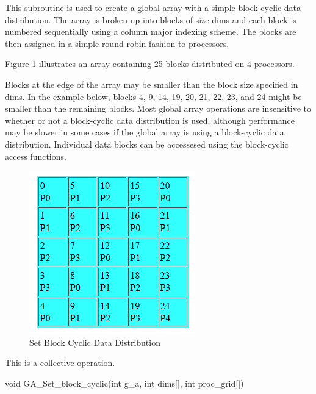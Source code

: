 \documentclass[12pt]{article}
\begin{document}
\begin{desc}

  This subroutine is used to create a global array with a simple
  block-cyclic data distribution. The array is broken up into blocks
  of size dims and each block is numbered sequentially using a column
  major indexing scheme. The blocks are then assigned in a simple
  round-robin fashion to processors.

Figure \ref{stblkcy} illustrates an array containing 25 blocks distributed on 4 processors.

  Blocks at the edge of the array may be smaller than the block size
  specified in dims. In the example below, blocks
  4, 9, 14, 19, 20, 21, 22, 23, and 24 might be smaller than the remaining
  blocks. Most global array operations are insensitive to whether or
  not a block-cyclic data distribution is used, although performance
  may be slower in some cases if the global array is using a
  block-cyclic data distribution. Individual data blocks can be
  accessesed using the block-cyclic access functions.

\begin{figure}
\centering
\includegraphics{StBlkCy}
\caption{Set Block Cyclic Data Distribution}
\label{stblkcy}
\end{figure}

  This is a collective operation.

\end{desc}


\begin{capi}
\begin{ccode}
void GA_Set_block_cyclic(int g_a, int dims[], int proc_grid[])
\end{ccode}
\begin{funcargs}
\end{funcargs}
\end{capi}
\end{document}
